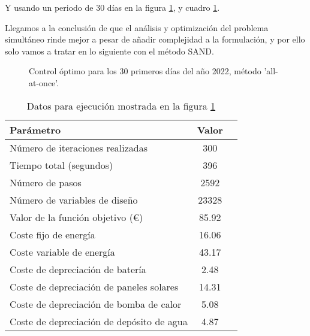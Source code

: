 Y usando un periodo de 30 días en la figura \ref{fig:control_sand_30_days}, y
cuadro \ref{tab:control_sand_30_days}.

Llegamos a la conclusión de que el análisis y optimización del problema
simultáneo rinde mejor a pesar de añadir complejidad a la formulación, y por
ello solo vamos a tratar en lo siguiente con el método SAND.

\begin{figure}[h] \centering
	\centering
	
	\caption{Control óptimo para los 30 primeros días del año 2022, método 'all-at-once'.}
	\label{fig:control_sand_30_days}
\end{figure}

\begin{table}[ht]
	\centering
	\caption{Datos para ejecución mostrada en la figura \ref{fig:control_sand_30_days}}
	\label{tab:control_sand_30_days}
	\begin{tabular}{@{}lcc@{}}
		\toprule
		Parámetro                                 & Valor \\
		\midrule
		Número de iteraciones realizadas          & 300   \\
		Tiempo total (segundos)                   & 396   \\
		Número de pasos                           & 2592  \\
		Número de variables de diseño             & 23328 \\
		\midrule
		Valor de la función objetivo (€)          & 85.92 \\
		\midrule
		Coste fijo de energía                     & 16.06 \\
		Coste variable de energía                 & 43.17 \\
		Coste de depreciación de batería          & 2.48  \\
		Coste de depreciación de paneles solares  & 14.31 \\
		Coste de depreciación de bomba de calor   & 5.08  \\
		Coste de depreciación de depósito de agua & 4.87  \\
		\bottomrule
	\end{tabular}
\end{table}
